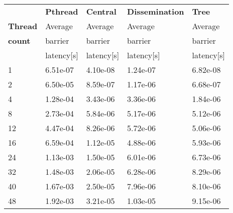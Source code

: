 \begin{tabular}{l|llll}
& \textbf{Pthread} & \textbf{Central} & \textbf{Dissemination} & \textbf{Tree} \\
\textbf{Thread} & Average & Average & Average & Average\\
\textbf{count} & barrier & barrier & barrier & barrier\\
  & latency[s] & latency[s] & latency[s] & latency[s]\\\hline
 1 & 6.51e-07 & 4.10e-08 & 1.24e-07 & 6.82e-08 \\
2 & 6.50e-05 & 8.59e-07 & 1.17e-06 & 6.68e-07 \\
4 & 1.28e-04 & 3.43e-06 & 3.36e-06 & 1.84e-06 \\
8 & 2.73e-04 & 5.84e-06 & 5.17e-06 & 5.12e-06 \\
12 & 4.47e-04 & 8.26e-06 & 5.72e-06 & 5.06e-06 \\
16 & 6.59e-04 & 1.12e-05 & 4.88e-06 & 5.93e-06 \\
24 & 1.13e-03 & 1.50e-05 & 6.01e-06 & 6.73e-06 \\
32 & 1.48e-03 & 2.06e-05 & 6.28e-06 & 8.29e-06 \\
40 & 1.67e-03 & 2.50e-05 & 7.96e-06 & 8.10e-06 \\
48 & 1.92e-03 & 3.21e-05 & 1.03e-05 & 9.15e-06 \\
\end{tabular}

